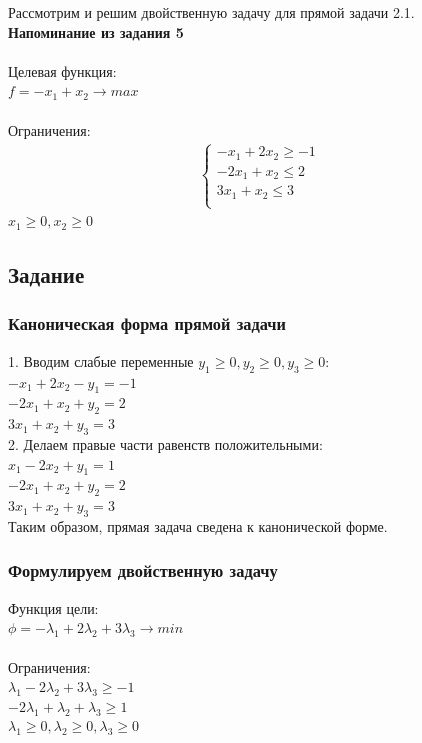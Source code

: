 \documentclass[14pt,a4paper,fleqn]{extarticle}
\begin{document}
	Рассмотрим и решим двойственную задачу для прямой задачи 2.1.
	\noindent\makebox[\linewidth]{\rule{\paperwidth}{0.4pt}}\\
	\textbf{Напоминание из задания 5}\\\\
	Целевая функция:\\
	$f = -x_1+x_2 \longrightarrow max$\\\\
	Ограничения:
	\begin{align*}
		\begin{cases}
			-x_1 + 2x_2 \geq -1\\
			-2x_1 + x_2 \leq 2\\
			3x_1 + x_2 \leq 3\\
		\end{cases}
	\end{align*}
	$x_1 \geq 0, x_2 \geq 0$
	\subsection*{Задание}
	\subsubsection*{Каноническая форма прямой задачи}
	1. Вводим слабые переменные $y_1 \geq 0, y_2 \geq 0, y_3 \geq 0$:\\
	$-x_1 + 2x_2 - y_1 = -1$\\
	$-2x_1 + x_2 + y_2 = 2$\\
	$3x_1 + x_2 + y_3 = 3$\\
	
	2. Делаем правые части равенств положительными:\\
	$x_1 - 2x_2 + y_1 = 1$\\
	$-2x_1 + x_2 + y_2 = 2$\\
	$3x_1 + x_2 + y_3 = 3$\\
	
	Таким образом, прямая задача сведена к канонической форме.
	\newpage
	\subsubsection*{Формулируем двойственную задачу}
	Функция цели:\\
	$\phi = -\lambda_1 + 2\lambda_2 + 3\lambda_3 \longrightarrow min$\\\\
	Ограничения:\\
	$\lambda_1 - 2\lambda_2 + 3\lambda_3 \geq -1$\\
	$-2\lambda_1 + \lambda_2 + \lambda_3 \geq 1$\\
	$\lambda_1 \geq 0, \lambda_2 \geq 0, \lambda_3 \geq 0$\\
	\noindent\makebox[\linewidth]{\rule{\paperwidth}{0.4pt}}
\end{document}
